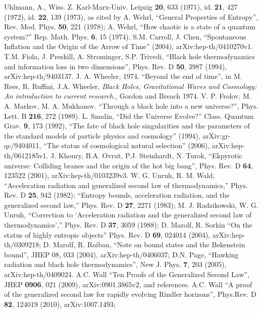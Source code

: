 \documentclass{article}
\begin{document}
\begin{thebibliography}{99}
Uhlmann, A., Wiss. Z. Karl-Marx-Univ. Leipzig \textbf{20}, 633 (1971), id. \textbf{21}, 427 (1972), id. \textbf{22}, 139 (1973), as cited by A. Wehrl, ``General Properties of Entropy'', Rev. Mod. Phys. \textbf{50}, 221 (1978); A. Wehrl, ``How chaotic is a state of a quantum system?'' Rep. Math. Phys. \textbf{6}, 15 (1974).
S.M. Carroll, J. Chen, ``Spontaneous Inflation and the Origin of the Arrow of Time'' (2004), arXiv:hep-th/0410270v1.
T.M. Fiola, J. Preskill, A. Strominger, S.P. Trivedi, ``Black hole thermodynamics and information loss in two dimensions'', Phys. Rev. D \textbf{50}, 3987 (1994), arXiv:hep-th/9403137.
J. A. Wheeler, 1974. ``Beyond the end of time'', in M. Rees, R. Ruffini, J.A. Wheeler, \textit{Black Holes, Gravitational Waves and Cosmology: An introduction to current research.}, Gordon and Breach 1974.
V. P. Frolov, M. A. Markov, M. A. Mukhanov. ``Through a black hole into a new universe?'', Phys. Lett. B \textbf{216}, 272 (1989).
L. Smolin, ``Did the Universe Evolve?'' Class. Quantum Grav. \textbf{9}, 173 (1992), ``The fate of black hole singularities and the parameters of the standard models of particle physics and cosmology'' (1994), arXiv:gr-qc/9404011, ``The status of cosmological natural selection'' (2006), arXiv:hep-th/0612185v1.
J. Khoury, B.A. Ovrut, P.J. Steinhardt, N. Turok, ``Ekpyrotic universe: Colliding branes and the origin of the hot big bang'', Phys. Rev. D \textbf{64}, 123522 (2001), arXiv:hep-th/0103239v3.
W. G. Unruh, R. M. Wald, ``Acceleration radiation and generalized second law of thermodynamics,'' Phys. Rev. D \textbf{25}, 942 (1982);
``Entropy bounds, acceleration radiation, and the generalized second law,'' Phys. Rev. D \textbf{27}, 2271 (1983);
M. J. Radzikowski, W. G. Unruh, ``Correction to `Acceleration radiation and
the generalized second law of thermodynamics','' Phys. Rev. D \textbf{37}, 3059 (1988); 
D. Marolf, R. Sorkin ``On the status of highly entropic objects'' Phys. Rev. D \textbf{69}, 024014 (2004), arXiv:hep-th/0309218;
D. Marolf, R. Roiban, ``Note on bound states and the Bekenstein bound'', JHEP 08, 033 (2004), arXiv:hep-th/0406037; 
D.N. Page, ``Hawking radiation and black hole thermodynamics'', New J. Phys. \textbf{7}, 203 (2005), arXiv:hep-th/0409024.
A.C. Wall ``Ten Proofs of the Generalized Second Law'', JHEP \textbf{0906}, 021 (2009), arXiv:0901.3865v2, and references.
A.C. Wall ``A proof of the generalized second law for rapidly evolving Rindler horizons'', Phys.Rev. D \textbf{82}, 124019 (2010), arXiv:1007.1493; 

\end{thebibliography}
\end{document}
